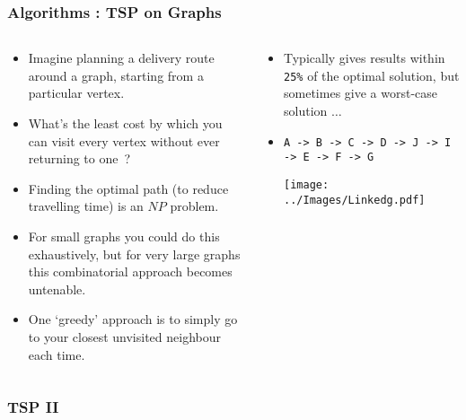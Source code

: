 \begin{frame}[fragile]
\frametitle{Algorithms : TSP on Graphs}
\begin{columns}[T]

\begin{column}{0.45\textwidth}
\begin{itemize}[<+->]
\item Imagine planning a delivery route around a graph, starting from a particular vertex.
\item What's the least cost by which you can visit every vertex without ever returning to one~?
\item Finding the optimal path (to reduce travelling time) is an $NP$ problem.
\item For small graphs you could do this exhaustively, but for very large graphs this combinatorial approach becomes untenable.
\item One `greedy' approach is to simply go to your closest unvisited neighbour each time.
\end{itemize}
\end{column}

\pause
\begin{column}{0.45\textwidth}
\begin{itemize}[<+->]
\item Typically gives results within \verb^25%^
of the optimal solution, but sometimes give a worst-case solution $\ldots$
\item 
{\scriptsize \verb^A -> B -> C -> D -> J -> I -> E -> F -> G^}

\begin{center}
\texttt{[image: ../Images/Linkedg.pdf]}
\end{center}
\end{itemize}
\end{column}

\end{columns}
\end{frame}


\begin{frame}[fragile]
\frametitle{TSP II}
\begin{columns}[T]

\begin{column}{0.45\textwidth}

\end{column}

\pause
\begin{column}{0.45\textwidth}

\end{column}

\end{columns}
\end{frame}



